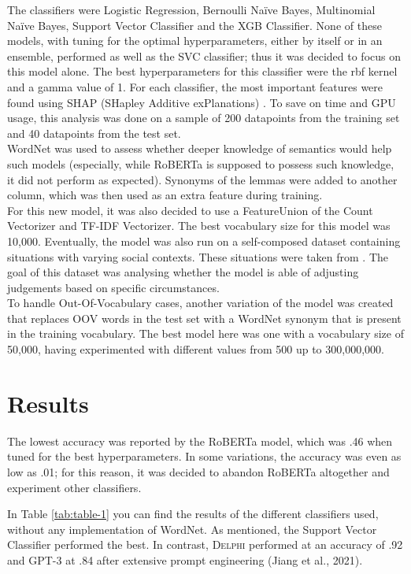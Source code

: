 \documentclass[final]{clv3} %
\begin{document}
The classifiers were Logistic Regression, Bernoulli Naïve Bayes, Multinomial Naïve Bayes, Support Vector Classifier and the XGB Classifier. None of these models, with tuning for the optimal hyperparameters, either by itself or in an ensemble, performed as well as the SVC classifier; thus it was decided to focus on this model alone. The best hyperparameters for this classifier were the rbf kernel and a gamma value of 1. For each classifier, the most important features were found using SHAP (SHapley Additive exPlanations) \cite{shap}. To save on time and GPU usage, this analysis was done on a sample of 200 datapoints from the training set and 40 datapoints from the test set.\\

WordNet \cite{miller} was used to assess whether deeper knowledge of semantics would help such models (especially, while RoBERTa is supposed to possess such knowledge, it did not perform as expected). Synonyms of the lemmas were added to another column, which was then used as an extra feature during training.\\

For this new model, it was also decided to use a FeatureUnion of the Count Vectorizer and TF-IDF Vectorizer. The best vocabulary size for this model was 10,000. Eventually, the model was also run on a self-composed dataset containing situations with varying social contexts. These situations were taken from \citet{jiang}. The goal of this dataset was analysing whether the model is able of adjusting judgements based on specific circumstances.\\

To handle Out-Of-Vocabulary cases, another variation of the model was created that replaces OOV words in the test set with a WordNet synonym that is present in the training vocabulary. The best model here was one with a vocabulary size of 50,000, having experimented with different values from 500 up to 300,000,000.

\section{Results}

The lowest accuracy was reported by the RoBERTa model, which was .46 when tuned for the best hyperparameters. In some variations, the accuracy was even as low as .01; for this reason, it was decided to abandon RoBERTa altogether and experiment other classifiers.

In Table \ref{tab:table-1} you can find the results of the different classifiers used, without any implementation of WordNet. As mentioned, the Support Vector Classifier performed the best. In contrast, \textsc{Delphi} performed at an accuracy of .92 and GPT-3 at .84 after extensive prompt engineering (Jiang et al., 2021).
\end{document}
